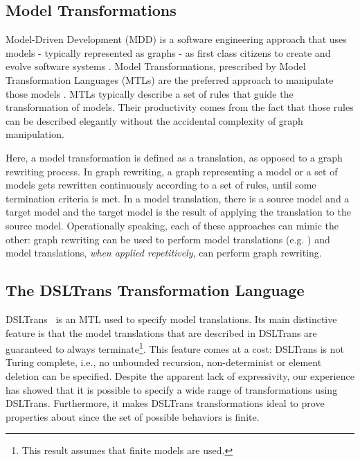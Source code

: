 \subsection{Model Transformations}

Model-Driven Development (MDD) is a software engineering approach that uses
models - typically represented as graphs - as first class citizens to create and evolve software systems
\cite{Hailpern:2006vd}.
Model Transformations, prescribed by Model Transformation Languages (MTLs) are the preferred approach to manipulate those models \cite{Software2003}.
MTLs typically describe a set of rules that guide the transformation of models.
Their productivity comes from the fact that those rules can be described elegantly without the accidental complexity of graph manipulation.

Here, a model transformation is defined as a translation, as opposed to a graph rewriting process.
In graph rewriting, a graph representing a model or a set of models gets rewritten continuously according to a set of rules, until some termination criteria is met. 
In a model translation, there is a source model and a target model and the target model is the result of applying the translation to the source model.
Operationally speaking, each of these approaches can mimic the other: graph rewriting can be used to perform model translations (e.g. \cite{Grunske2005}) and model translations, \emph{when applied repetitively}, can perform graph rewriting.

\subsection{The DSLTrans Transformation Language}

DSLTrans~\cite{Barroca2011} is an MTL used to specify model translations.
Its main distinctive feature is that the model translations that are described in DSLTrans are guaranteed to always terminate\footnote{This result assumes that finite models are used.}. This feature comes at a cost: DSLTrans is not Turing complete, i.e., no unbounded recursion, non-determinist or element deletion
can be specified. Despite the apparent lack of expressivity, our experience has showed that it is possible to specify a wide range of transformations using DSLTrans. Furthermore, it makes DSLTrans transformations ideal to prove properties about since the set of possible behaviors is finite.

